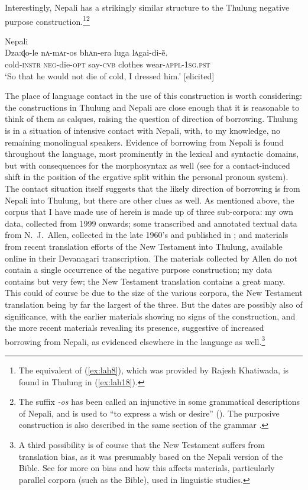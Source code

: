 \documentclass[output=paper,colorlinks,citecolor=brown,
]{langscibook}
\begin{document}
Interestingly, Nepali has a strikingly similar structure to the Thulung negative purpose construction.\footnote{The equivalent of (\ref{ex:lah8}), which was provided by Rajesh Khatiwada, is found in Thulung in (\ref{ex:lah18}).}\footnote{The suffix \textit{-os} has been called an injunctive in some grammatical descriptions of Nepali, and is used to ``to express a wish or desire'' (\citealt[197]{Matthews1998}). The purposive construction is also described in the same section of the grammar \citep[199]{Matthews1998}.}


\ea \label{ex:lah8} \textnormal{Nepali} \\
\gll Dza:ɖo-le nʌ-mʌr-os bhʌn-era luga lʌgai-di-ẽ. \\
cold-\textsc{instr} \textsc{neg}-die-\textsc{opt} say-\textsc{cvb} clothes wear-\textsc{appl-1sg.pst} \\
\glt `So that he would not die of cold, I dressed him.' [elicited]
\z


 The place of language contact in the use of this construction is worth considering: the constructions in Thulung and Nepali are close enough that it is reasonable to think of them as calques, raising the question of direction of borrowing. Thulung is in a situation of intensive contact with Nepali, with, to my knowledge, no remaining monolingual speakers. Evidence of borrowing from Nepali is found throughout the language, most prominently in the lexical and syntactic domains, but with consequences for the morphosyntax as well (see \citealt{Lahaussois2003} for a contact-induced shift in the position of the ergative split within the personal pronoun system). The contact situation itself suggests that the likely direction of borrowing is from Nepali into Thulung, but there are other clues as well. As mentioned above, the corpus that I have made use of herein is made up of three sub-corpora: my own data, collected from 1999 onwards; some transcribed and annotated textual data from N.\ J.\ Allen, collected in the late 1960's and published in \citet{Allen1975}; and materials from recent translation efforts of the New Testament into Thulung, available online in their Devanagari transcription. The materials collected by Allen do not contain a single occurrence of the negative purpose construction; my data contains but very few; the New Testament translation contains a great many. This could of course be due to the size of the various corpora, the New Testament translation being by far the largest of the three. But the dates are possibly also of significance, with the earlier materials showing no signs of the construction, and the more recent materials revealing its presence, suggestive of increased borrowing from Nepali, as evidenced elsewhere in the language as well.\footnote{A third possibility is of course that the New Testament suffers from translation bias, as it was presumably based on the Nepali version of the Bible. See \citet{Wälchli2007} for more on bias and how this affects materials, particularly parallel corpora (such as the Bible), used in linguistic studies.}
\end{document}
